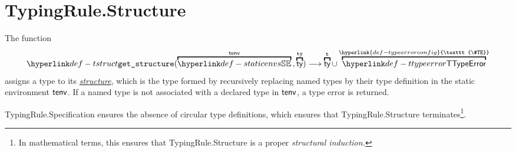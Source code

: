\documentclass{book}
\newcommand\TypeErrorConfig[0]{\hyperlink{def-typeerrorconfig}{\texttt{\#TE}}}
\newcommand\structure[0]{\hyperlink{def-structure}{structure}}
\newcommand\vt[0]{\texttt{t}}
\newcommand\tty[0]{\texttt{ty}}
\begin{document}
\section{TypingRule.Structure \label{sec:structure}}
\hypertarget{def-structure}{}
The function
\[
  \tstruct(\overname{\staticenvs}{\tenv} \aslsep \overname{\ty}{\tty}) \aslto \overname{\ty}{\vt} \cup \overname{\TTypeError}{\TypeErrorConfig}
\]
assigns a type to its \hypertarget{def-tstruct}{\emph{\structure}}, which is the type formed by
recursively replacing named types by their type definition in the static environment $\textsf{tenv}$.
If a named type is not associated with a declared type in $\textsf{tenv}$, a type error is returned.

TypingRule.Specification ensures the absence of circular type definitions,
which ensures that TypingRule.Structure terminates\footnote{In mathematical terms,
this ensures that TypingRule.Structure is a proper \emph{structural induction.}}.
\end{document}
